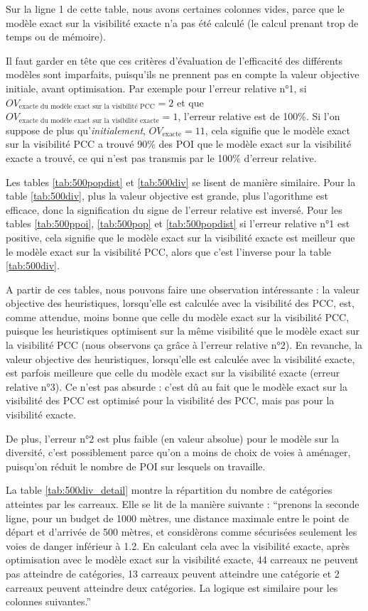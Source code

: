 Sur la ligne 1 de cette table, nous avons certaines colonnes vides, parce que le modèle exact sur la visibilité exacte n'a pas été calculé (le calcul prenant trop de temps ou de mémoire).

Il faut garder en tête que ces critères d'évaluation de l'efficacité des différents modèles sont imparfaits, puisqu'ils ne prennent pas en compte la valeur objective initiale, avant optimisation. Par exemple pour l'erreur relative n°1, si $OV_{\text{exacte du modèle exact sur la visibilité PCC}}=2$ et que $OV_{\text{exacte du modèle exact sur la visibilité exacte}}=1$, l'erreur relative est de 100\%. Si l'on suppose de plus qu'\emph{initialement}, $OV_{\text{exacte}}=11$, cela signifie que le modèle exact sur la visibilité PCC a trouvé 90\% des POI que le modèle exact sur la visibilité exacte a trouvé, ce qui n'est pas transmis par le 100\% d'erreur relative.

Les tables \ref{tab:500popdist} et \ref{tab:500div} se lisent de manière similaire. Pour la table \ref{tab:500div}, plus la valeur objective est grande, plus l'agorithme est efficace, donc la signification du signe de l'erreur relative est inversé. Pour les tables \ref{tab:500ppoi}, \ref{tab:500pop} et \ref{tab:500popdist} si l'erreur relative n°1 est positive, cela signifie que le modèle exact sur la visibilité exacte est meilleur que le modèle exact sur la visibilité PCC, alors que c'est l'inverse pour la table \ref{tab:500div}.

A partir de ces tables, nous pouvons faire une observation intéressante : la valeur objective des heuristiques, lorsqu'elle est calculée avec la visibilité des PCC, est, comme attendue, moins bonne que celle du modèle exact sur la visibilité PCC, puisque les heuristiques optimisent sur la même visibilité que le modèle exact sur la visibilité PCC (nous observons ça grâce à l'erreur relative n°2). En revanche, la valeur objective des heuristiques, lorsqu'elle est calculée avec la visibilité exacte, est parfois meilleure que celle du modèle exact sur la visibilité exacte (erreur relative n°3). Ce n'est pas absurde : c'est dû au fait que le modèle exact sur la visibilité des PCC est optimisé pour la visibilité des PCC, mais pas pour la visibilité exacte.

De plus, l'erreur n°2 est plus faible (en valeur absolue) pour le modèle sur la diversité, c'est possiblement parce qu'on a moins de choix de voies à aménager, puisqu'on réduit le nombre de POI sur lesquels on travaille.

La table \ref{tab:500div_detail} montre la répartition du nombre de catégories atteintes par les carreaux. Elle se lit de la manière suivante : ``prenons la seconde ligne, pour un budget de 1000 mètres, une distance maximale entre le point de départ et d'arrivée de 500 mètres, et considèrons comme sécurisées seulement les voies de danger inférieur à 1.2. En calculant cela avec la visibilité exacte, après optimisation avec le modèle exact sur la visibilité exacte, 44 carreaux ne peuvent pas atteindre de catégories, 13 carreaux peuvent atteindre une catégorie et 2 carreaux peuvent atteindre deux catégories. La logique est similaire pour les colonnes suivantes.''

